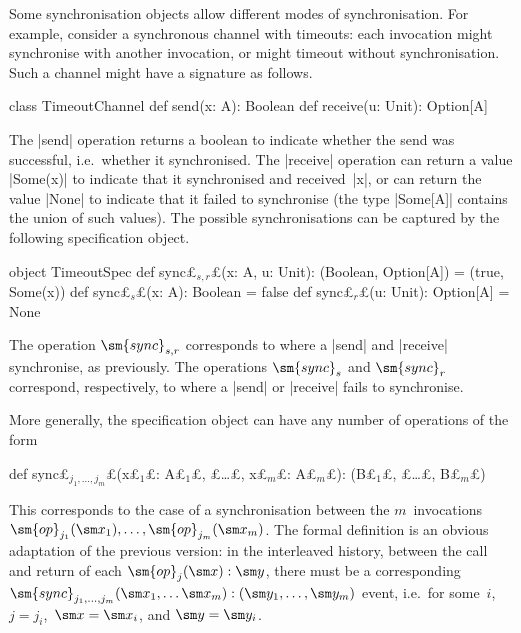 \documentclass[12pt,a4paper]{article}
\def\s#1{$_{#1}$}
\begin{document}



Some synchronisation objects allow different modes of synchronisation.  For
example, consider a synchronous channel with timeouts: each invocation might
synchronise with another invocation, or might timeout without
synchronisation.  Such a channel might have a signature as follows.
%
\begin{scala}
class TimeoutChannel{
  def send(x: A): Boolean
  def receive(u: Unit): Option[A]
}
\end{scala}
%
The |send| operation returns a boolean to indicate whether the send was
successful, i.e.~whether it synchronised.  The |receive| operation can return
a value |Some(x)| to indicate that it synchronised and received~|x|, or can
return the value |None| to indicate that it failed to synchronise (the type
|Some[A]| contains the union of such values).  The possible synchronisations
can be captured by the following specification object.
\begin{scala}
object TimeoutSpec{
  def sync£$_{s,r}$£(x: A, u: Unit): (Boolean, Option[A]) = (true, Some(x))
  def sync£$_s$£(x: A): Boolean = false
  def sync£$_r$£(u: Unit): Option[A] = None
}
\end{scala}
%
The operation $\sm{sync}_{s,r}$ corresponds to where a |send| and |receive|
synchronise, as previously.  The operations $\sm{sync}_s$ and $\sm{sync}_r$
correspond, respectively, to where a |send| or |receive| fails to
synchronise.  

More generally, the specification object can have any number of operations of
the form
%
\begin{scala}
  def sync£$_{j_1, \ldots, j_m}$£(x£\s1£: A£\s1£, £\ldots£, x£\s m£: A£\s m£): (B£\s1£, £\ldots£, B£\s m£)
\end{scala}
%
This corresponds to the case of a synchronisation between the $m$~invocations
$\sm{op}_{j_1}(\sm x_1), \ldots, \sm{op}_{j_m}(\sm x_m)$.  The formal
definition is an obvious adaptation of the previous version: in the
interleaved history, between the call and return of each $\sm{op}_j(\sm x):
\sm y$, there must be a corresponding $\sm{sync}_{j_1, \ldots, j_m}(\sm x_1,
\ldots \sm x_m): (\sm y_1, \ldots, \sm y_m)$ event, i.e.~for some~$i$,\, $j =
j_i$,\, $\sm x = \sm x_i$, and $\sm y = \sm y_i$.
\end{document}
